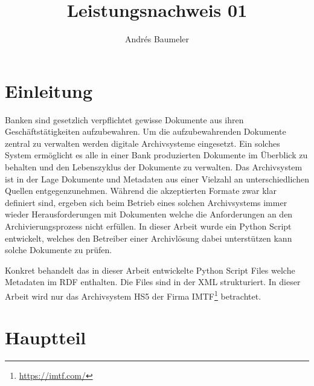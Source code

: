 \documentclass[a4paper,oneside, 12pt]{report}
\title{Leistungsnachweis 01}
\author{Andrés Baumeler}
\begin{document}

\pagestyle{empty} %





\cleardoublepage
\tableofcontents %
\cleardoublepage %

\pagestyle{plain} %



\chapter{Einleitung}\label{sec:motivation}
Banken sind gesetzlich verpflichtet gewisse Dokumente aus ihren Geschäftstätigkeiten aufzubewahren. Um die aufzubewahrenden Dokumente zentral zu verwalten werden digitale Archivsysteme eingesetzt. Ein solches System ermöglicht es alle in einer Bank produzierten Dokumente im Überblick zu behalten und den Lebenszyklus der Dokumente zu verwalten. Das Archivsystem ist in der Lage Dokumente und Metadaten aus einer Vielzahl an unterschiedlichen Quellen entgegenzunehmen. Während die akzeptierten Formate zwar klar definiert sind, ergeben sich beim Betrieb eines solchen Archivsystems immer wieder Herausforderungen mit Dokumenten welche die Anforderungen an den Archivierungsprozess nicht erfüllen. In dieser Arbeit wurde ein Python Script entwickelt, welches den Betreiber einer Archivlösung dabei unterstützen kann solche Dokumente zu prüfen.

Konkret behandelt das in dieser Arbeit entwickelte Python Script Files welche Metadaten im \ac{RDF} enthalten. Die Files sind in der \ac{XML} strukturiert. In dieser Arbeit wird nur das Archivsystem \ac{HS5} der Firma IMTF\footnote{\url{https://imtf.com/}} betrachtet.

\chapter{Hauptteil}\label{sec:motivation}
\end{document}

